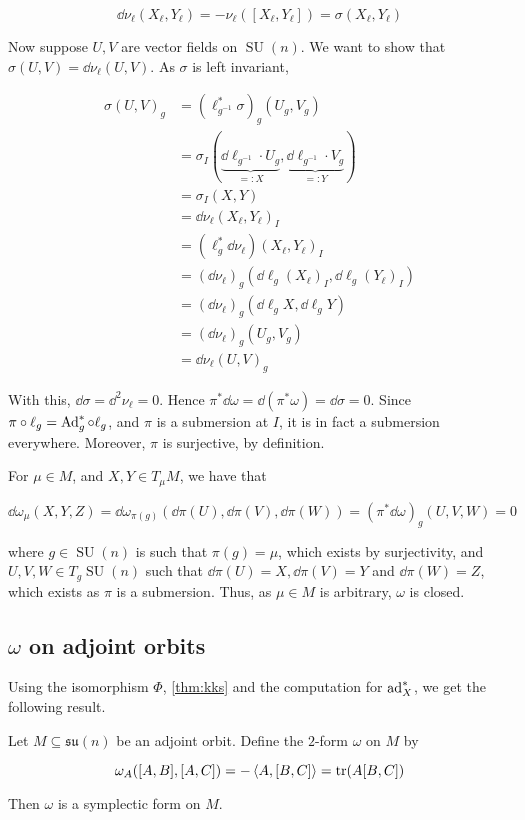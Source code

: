 \documentclass{article}
\DeclareMathOperator{\SU}{SU}
\newcommand{\su}{\mathfrak{su}}
\begin{document}
\[\dd \nu_\ell(X_\ell, Y_\ell) = -\nu_\ell([X_\ell, Y_\ell]) = \sigma(X_\ell, Y_\ell)\]

Now suppose \(U, V\) are vector fields on \(\SU(n)\). We want to show that \(\sigma(U, V) = \dd\nu_\ell(U, V)\). As \(\sigma\) is left invariant,

\begin{align*}
    \sigma(U, V)_g &= (\ell_{g^{-1}}^* \sigma)_g(U_g, V_g) \\
    &= \sigma_I(\underbrace{\dd \ell_{g^{-1}} \cdot U_g}_{=:X}, \underbrace{\dd \ell_{g^{-1}} \cdot V_g}_{=:Y}) \\
    &= \sigma_I(X, Y) \\
    &= \dd\nu_\ell(X_\ell, Y_\ell)_I \\
    &= (\ell_g^*\dd\nu_\ell)(X_\ell, Y_\ell)_I \\
    &= (\dd\nu_\ell)_g(\dd\ell_g(X_\ell)_I, \dd\ell_g(Y_\ell)_I) \\
    &= (\dd\nu_\ell)_g(\dd \ell_g X, \dd\ell_g Y) \\
    &= (\dd\nu_\ell)_g(U_g, V_g) \\
    &= \dd\nu_\ell(U, V)_g
\end{align*}

With this, \(\dd\sigma = \dd^2\nu_\ell = 0\). Hence \(\pi^*\dd\omega = \dd(\pi^*\omega) = \dd\sigma = 0\). Since \(\pi \circ \ell_g = \operatorname{Ad}_g^* \circ \ell_g\), and \(\pi\) is a submersion at \(I\), it is in fact a submersion everywhere. Moreover, \(\pi\) is surjective, by definition.

For \(\mu \in  M\), and \(X, Y \in T_\mu  M\), we have that

\[\dd\omega_\mu(X, Y, Z) = \dd\omega_{\pi(g)}(\dd\pi(U), \dd\pi(V), \dd\pi(W)) = (\pi^*\dd\omega)_g(U, V, W) = 0\]

where \(g \in \SU(n)\) is such that \(\pi(g) = \mu\), which exists by surjectivity, and \(U, V, W \in T_g\SU(n)\) such that \(\dd\pi(U) = X, \dd\pi(V) = Y\) and \(\dd\pi(W) = Z\), which exists as \(\pi\) is a submersion. Thus, as \(\mu \in  M\) is arbitrary, \(\omega\) is closed.

\subsection{\(\omega\) on adjoint orbits}

Using the isomorphism \(\Phi\), \cref{thm:kks} and the computation for \(\operatorname{ad}_X^*\), we get the following result.

\begin{theorem}
    Let \(M \subseteq \su(n)\) be an adjoint orbit. Define the \(2\)-form \(\omega\) on \(M\) by

    \[\omega_A([A, B], [A, C]) = -\left\langle A, [B, C] \right\rangle = \tr(A[B, C])\]

    Then \(\omega\) is a symplectic form on \(M\).
\end{theorem}
\end{document}
